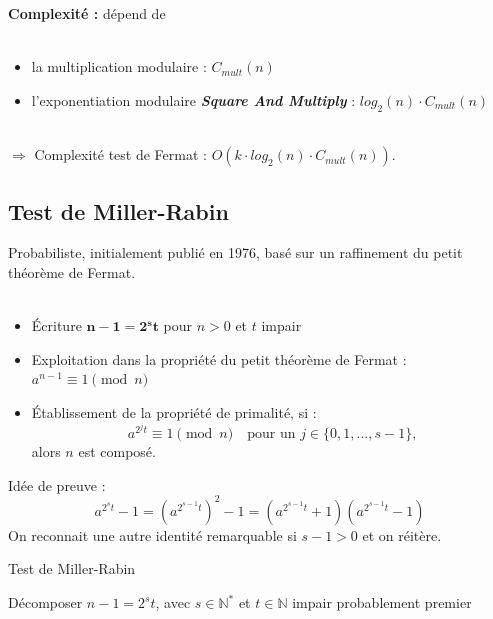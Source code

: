			\begin{frame}
				\textbf{Complexité :} dépend de \\~\\
				\begin{itemize}
				\item la multiplication modulaire : $C_{mult}(n)$
				\item l'exponentiation modulaire \textbf{\textit{Square And Multiply}} : $log_{2}(n) \cdot C_{mult}(n)$
				\end{itemize}
				~\\
				$\Longrightarrow$ Complexité test de Fermat : $O(k \cdot log_{2}(n) \cdot C_{mult}(n))$.
			\end{frame}
		
		\subsection{Test de Miller-Rabin}
			\begin{frame}
			Probabiliste, initialement publié en 1976, basé sur un raffinement du petit théorème de Fermat.\\~\\
			\begin{itemize}
				\item Écriture $\mathbf{n - 1 = 2^{s}t}$ pour $n>0$ et $t$ impair
				\item Exploitation dans la propriété du petit théorème de Fermat : $a^{n-1}\equiv 1 \pmod n$
				\item Établissement de la propriété de primalité, si :
				\[ a^{2^{j}t} \equiv 1 \pmod n \quad \text{pour un } j \in \{0, 1, ..., s-1\} \text{,}\]
				alors $n$ est composé.
			\end{itemize}
			Idée de preuve :
			\[
				a^{2^{s}t} - 1 = (a^{2^{s-1}t})^{2} - 1 = (a^{2^{s-1}t} + 1)(a^{2^{s-1}t} - 1)
			\]
			On reconnait une autre identité remarquable si $s-1 > 0$ et on réitère.
			\end{frame}
			
			\begin{frame}
			
				\begin{algorithm}[H]
				\caption{Test de Miller-Rabin}\label{TMR}
				{Décomposer $n - 1 = 2^{s}t$, avec $s \in \mathbb{N}^{*}$ et $t \in \mathbb{N}$ impair \;}
				\Retour probablement premier\;
				\end{algorithm}
		
			\end{frame}
			
